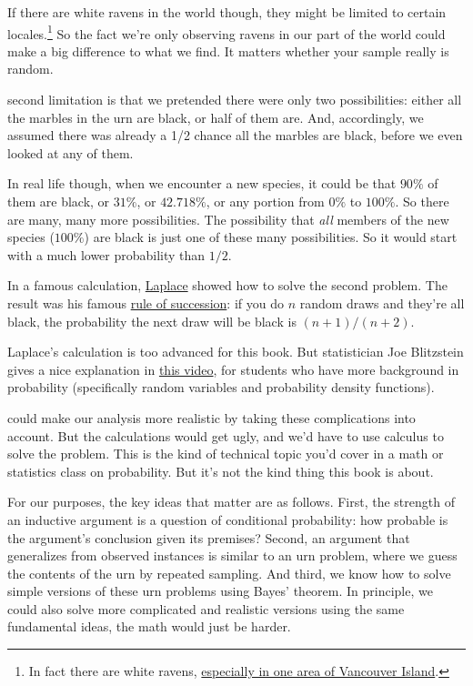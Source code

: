 \documentclass[justified]{tufte-book}
\theoremstyle{definition}
\theoremstyle{definition}
\theoremstyle{definition}
\theoremstyle{remark}
\begin{document}
If there are white ravens in the world though, they might be limited to certain locales.\footnote{In fact there are white ravens, \href{https://vancouversun.com/news/local-news/rare-white-raven-spotted-on-vancouver-island}{especially in one area of Vancouver Island}.} So the fact we're only observing ravens in our part of the world could make a big difference to what we find. It matters whether your sample really is random.

 second limitation is that we pretended there were only two possibilities: either all the marbles in the urn are black, or half of them are. And, accordingly, we assumed there was already a 1/2 chance all the marbles are black, before we even looked at any of them.

In real life though, when we encounter a new species, it could be that \(90\%\) of them are black, or \(31\%\), or \(42.718\%\), or any portion from \(0\%\) to \(100\%\). So there are many, many more possibilities. The possibility that \emph{all} members of the new species (\(100\%\)) are black is just one of these many possibilities. So it would start with a much lower probability than \(1/2\).

\begin{marginfigure}
In a famous calculation, \protect\hyperlink{fig:laplace}{Laplace} showed
how to solve the second problem. The result was his famous
\href{https://en.wikipedia.org/wiki/Rule_of_succession}{rule of
succession}: if you do \(n\) random draws and they're all black, the
probability the next draw will be black is \((n+1)/(n+2)\).

Laplace's calculation is too advanced for this book. But statistician
Joe Blitzstein gives a nice explanation in
\href{https://www.youtube.com/watch?v=N8O6zd6vTZ8\&list=EC2SOU6wwxB0uwwH80KTQ6ht66KWxbzTIo}{this
video}, for students who have more background in probability
(specifically random variables and probability density functions).
\end{marginfigure}

 could make our analysis more realistic by taking these complications into account. But the calculations would get ugly, and we'd have to use calculus to solve the problem. This is the kind of technical topic you'd cover in a math or statistics class on probability. But it's not the kind thing this book is about.

For our purposes, the key ideas that matter are as follows. First, the strength of an inductive argument is a question of conditional probability: how probable is the argument's conclusion given its premises? Second, an argument that generalizes from observed instances is similar to an urn problem, where we guess the contents of the urn by repeated sampling. And third, we know how to solve simple versions of these urn problems using Bayes' theorem. In principle, we could also solve more complicated and realistic versions using the same fundamental ideas, the math would just be harder.
\end{document}

